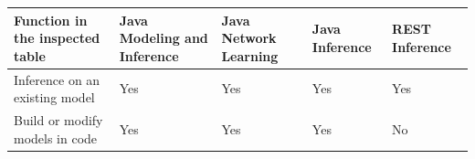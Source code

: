 \begin{longtable}[]{@{}lllll@{}}
\toprule
\begin{minipage}[b]{0.17\columnwidth}\raggedright
Function in the inspected table\strut
\end{minipage} & \begin{minipage}[b]{0.17\columnwidth}\raggedright
Java Modeling and Inference\strut
\end{minipage} & \begin{minipage}[b]{0.17\columnwidth}\raggedright
Java Network Learning\strut
\end{minipage} & \begin{minipage}[b]{0.17\columnwidth}\raggedright
Java Inference\strut
\end{minipage} & \begin{minipage}[b]{0.17\columnwidth}\raggedright
REST Inference\strut
\end{minipage}\tabularnewline
\midrule
\endhead
\begin{minipage}[t]{0.17\columnwidth}\raggedright
Inference on an existing model\strut
\end{minipage} & \begin{minipage}[t]{0.17\columnwidth}\raggedright
Yes\strut
\end{minipage} & \begin{minipage}[t]{0.17\columnwidth}\raggedright
Yes\strut
\end{minipage} & \begin{minipage}[t]{0.17\columnwidth}\raggedright
Yes\strut
\end{minipage} & \begin{minipage}[t]{0.17\columnwidth}\raggedright
Yes\strut
\end{minipage}\tabularnewline
\begin{minipage}[t]{0.17\columnwidth}\raggedright
Build or modify models in code\strut
\end{minipage} & \begin{minipage}[t]{0.17\columnwidth}\raggedright
Yes\strut
\end{minipage} & \begin{minipage}[t]{0.17\columnwidth}\raggedright
Yes\strut
\end{minipage} & \begin{minipage}[t]{0.17\columnwidth}\raggedright
Yes\strut
\end{minipage} & \begin{minipage}[t]{0.17\columnwidth}\raggedright
No\strut
\end{minipage}\tabularnewline

\end{longtable}
